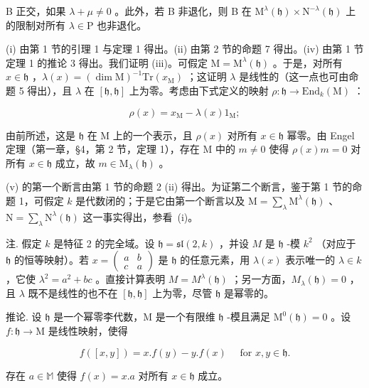B 正交，如果 \(\lambda + \mu \neq 0\) 。此外，若 B 非退化，则 B 在 \(\mathrm{M}^{\lambda}(\mathfrak{h}) \times \mathrm{N}^{-\lambda}(\mathfrak{h})\) 上的限制对所有 \(\lambda \in \mathrm{P}\) 也非退化。

(i) 由第 1 节的引理 1 与定理 1 得出。(ii) 由第 2 节的命题 7 得出。(iv) 由第 1 节定理 1 的推论 3 得出。我们证明 (iii)。可假定 \(\mathrm{M} = \mathrm{M}^{\lambda}(\mathfrak{h})\) 。于是，对所有 \(x \in \mathfrak{h}\) ，\(\lambda(x) = (\dim \mathrm{M})^{-1}\mathrm{Tr}(x_{\mathrm{M}})\) ；这证明 \(\lambda\) 是线性的（这一点也可由命题 5 得出），且 \(\lambda\) 在 \([\mathfrak{h},\mathfrak{h}]\) 上为零。考虑由下式定义的映射 \(\rho : \mathfrak{h} \to \mathrm{End}_k(\mathrm{M})\) ：

\[
\rho (x) = x _ {\mathrm{M}} - \lambda (x) 1 _ {\mathrm{M}};
\]

由前所述，这是 \(\mathfrak{h}\) 在 M 上的一个表示，且 \(\rho(x)\) 对所有 \(x \in \mathfrak{h}\) 幂零。由 Engel 定理（第一章，§4，第 2 节，定理 1），存在 M 中的 \(m \neq 0\) 使得 \(\rho(x)m = 0\) 对所有 \(x \in \mathfrak{h}\) 成立，故 \(m \in \mathrm{M}_{\lambda}(\mathfrak{h})\) 。

(v) 的第一个断言由第 1 节的命题 2 (ii) 得出。为证第二个断言，鉴于第 1 节的命题 1，可假定 \(k\) 是代数闭的；于是它由第一个断言以及 \(\mathrm{M} = \sum_{\lambda} \mathrm{M}^{\lambda}(\mathfrak{h})\) 、\(\mathrm{N} = \sum_{\lambda} \mathrm{N}^{\lambda}(\mathfrak{h})\) 这一事实得出，参看~(i)。

注. 假定 \(k\) 是特征 2 的完全域。设 \(\mathfrak{h} = \mathfrak{sl}(2, k)\) ，并设 \(M\) 是 \(\mathfrak{h}\) -模 \(k^2\) （对应于 \(\mathfrak{h}\) 的恒等映射）。若 \(x = \begin{pmatrix} a & b \\ c & a \end{pmatrix}\) 是 \(\mathfrak{h}\) 的任意元素，用 \(\lambda(x)\) 表示唯一的 \(\lambda \in k\) ，它使 \(\lambda^2 = a^2 + bc\) 。直接计算表明 \(M = M^\lambda(\mathfrak{h})\) ；另一方面，\(M_\lambda(\mathfrak{h}) = 0\) ，且 \(\lambda\) 既不是线性的也不在 \([\mathfrak{h}, \mathfrak{h}]\) 上为零，尽管 \(\mathfrak{h}\) 是幂零的。

推论. 设 \(\mathfrak{h}\) 是一个幂零李代数，M 是一个有限维 \(\mathfrak{h}\) -模且满足 \(\mathrm{M}^0 (\mathfrak{h}) = 0\) 。设 \(f:\mathfrak{h}\to \mathrm{M}\) 是线性映射，使得

\[
f ([ x, y ]) = x. f (y) - y. f (x) \quad \text { for } x, y \in \mathfrak {h}.
\]

存在 \(a \in \mathbb{M}\) 使得 \(f(x) = x.a\) 对所有 \(x \in \mathfrak{h}\) 成立。

